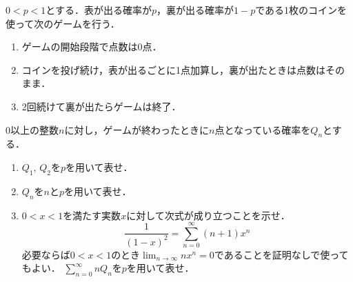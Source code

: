 \documentclass[../../main.tex]{subfiles}
\begin{document}
$0<p<1$とする．表が出る確率が$p$，裏が出る確率が$1-p$である1枚のコインを使って次のゲームを行う．
\begin{enumerate}
  \item[●]ゲームの開始段階で点数は0点．
  \item[●]コインを投げ続け，表が出るごとに1点加算し，裏が出たときは点数はそのまま．
  \item[●]2回続けて裏が出たらゲームは終了．
\end{enumerate}
0以上の整数$n$に対し，ゲームが終わったときに$n$点となっている確率を$Q_n$とする．
\begin{enumerate}
  \item$Q_1, \, Q_2$を$p$を用いて表せ．
  \item$Q_n$を$n$と$p$を用いて表せ．
  \item$0<x<1$を満たす実数$x$に対して次式が成り立つことを示せ．
    \[ \frac{1}{{ (1-x) }^2}=\sum_{n=0}^\infty(n+1)x^n \]
    必要ならば$0<x<1$のとき$\displaystyle\lim_{n\to\infty}nx^n=0$であることを証明なしで使ってもよい．
  $\displaystyle\sum_{n=0}^\infty nQ_n$を$p$を用いて表せ．
\end{enumerate}
\end{document}
